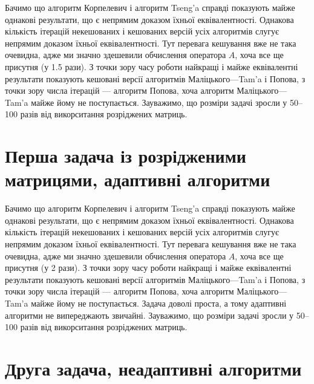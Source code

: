 

Бачимо що алгоритм Корпелевич і алгоритм Tseng'a справді показують майже однакові результати, що є непрямим доказом їхньої еквівалентності. Однакова кількість ітерацій некешованих і кешованих версій усіх алгоритмів слугує непрямим доказом їхньої еквівалентності. Тут перевага кешування вже не така очевидна, адже ми значно здешевили обчислення оператора $A$, хоча все ще присутня (у 1.5 рази). З точки зору часу роботи найкращі і майже еквівалентні результати показують кешовані версії алгоритмів Маліцького---Tam'a і Попова, з точки зору числа ітерацій --- алгоритм Попова, хоча алгоритм Маліцького---Tam'a майже йому не поступається. Зауважимо, що розміри задачі зросли у 50--100 разів від викорситання розріджених матриць.

\section{Перша задача із розрідженими матрицями, адаптивні алгоритми}



Бачимо що алгоритм Корпелевич і алгоритм Tseng'a справді показують майже однакові результати, що є непрямим доказом їхньої еквівалентності. Однакова кількість ітерацій некешованих і кешованих версій усіх алгоритмів слугує непрямим доказом їхньої еквівалентності. Тут перевага кешування вже не така очевидна, адже ми значно здешевили обчислення оператора $A$, хоча все ще присутня (у 2 рази). З точки зору часу роботи найкращі і майже еквівалентні результати показують кешовані версії алгоритмів Маліцького---Tam'a і Попова, з точки зору числа ітерацій --- алгоритм Попова, хоча алгоритм Маліцького---Tam'a майже йому не поступається. Задача доволі проста, а тому адаптивні алгоритми не випереджають звичайні. Зауважимо, що розміри задачі зросли у 50--100 разів від викорситання розріджених матриць.

\section{Друга задача, неадаптивні алгоритми}




